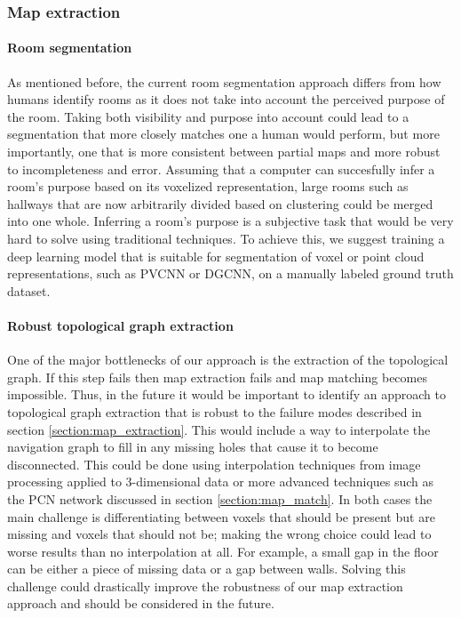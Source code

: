 \subsubsection{Map extraction}

\paragraph{Room segmentation}
As mentioned before, the current room segmentation approach differs from how humans identify rooms as it does not take into account the perceived purpose of the room. Taking both visibility and purpose into account could lead to a segmentation that more closely matches one a human would perform, but more importantly, one that is more consistent between partial maps and more robust to incompleteness and error. Assuming that a computer can succesfully infer a room's purpose based on its voxelized representation, large rooms such as hallways that are now arbitrarily divided based on clustering could be merged into one whole. Inferring a room's purpose is a subjective task that would be very hard to solve using traditional techniques. To achieve this, we suggest training a deep learning model that is suitable for segmentation of voxel or point cloud representations, such as PVCNN or DGCNN, on a manually labeled ground truth dataset. 

\paragraph{Robust topological graph extraction}
One of the major bottlenecks of our approach is the extraction of the topological graph. If this step fails then map extraction fails and map matching becomes impossible. Thus, in the future it would be important to identify an approach to topological graph extraction that is robust to the failure modes described in section \ref{section:map_extraction}. This would include a way to interpolate the navigation graph to fill in any missing holes that cause it to become disconnected. This could be done using interpolation techniques from image processing applied to 3-dimensional data or more advanced techniques such as the PCN network discussed in section \ref{section:map_match}. In both cases the main challenge is differentiating between voxels that should be present but are missing and voxels that should not be; making the wrong choice could lead to worse results than no interpolation at all. For example, a small gap in the floor can be either a piece of missing data or a gap between walls. Solving this challenge could drastically improve the robustness of our map extraction approach and should be considered in the future.

